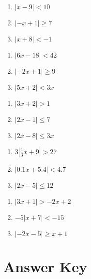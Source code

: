 \begin{multicols}{3}
\begin{enumerate}
	\item $|x-9| < 10$
	\item $|-x+1| \geq 7$
	\item $|x+8| < -1$
\end{enumerate}	\setcounter{Review}{\value{enumi}}
\end{multicols}
\begin{multicols}{3}
\begin{enumerate}	\setcounter{enumi}{\value{Review}}
	\item $|6x - 18| < 42$
	\item $|-2x+1| \geq 9$
	\item $|5x + 2| < 3x$
\end{enumerate}	\setcounter{Review}{\value{enumi}}
\end{multicols}
\begin{multicols}{3}
\begin{enumerate}	\setcounter{enumi}{\value{Review}}
	\item $|3x + 2| > 1$
    \item $|2x - 1| \leq 7$ 
    \item $|2x-8| \leq 3x$
\end{enumerate}	\setcounter{Review}{\value{enumi}}
\end{multicols}
\begin{multicols}{3}
\begin{enumerate}	\setcounter{enumi}{\value{Review}}
	\item $3\left| \frac{1}{3}x+9\right| > 27$
	\item $|0.1x+5.4| < 4.7$
	\item $|2x-5| \leq 12$
\end{enumerate}	\setcounter{Review}{\value{enumi}}
\end{multicols}
\begin{multicols}{3}
\begin{enumerate}	\setcounter{enumi}{\value{Review}}
	\item $|3x+1| > -2x+2$
	\item $-5|x+7| < -15$
	\item $|-2x-5| \geq x+1$
\end{enumerate}	\setcounter{Review}{\value{enumi}}
\end{multicols}

\newpage

\section{Answer Key}

